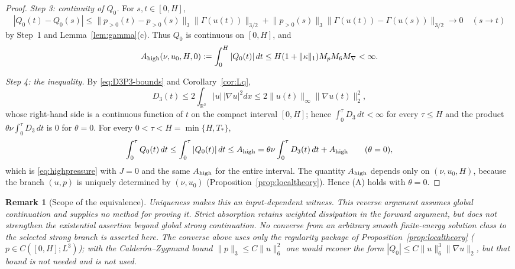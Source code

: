 \documentclass[11pt]{article}
\newtheorem{remark}[theorem]{Remark}
\theoremstyle{definition}
\theoremstyle{plain}
\newcommand{\R}{\mathbb R}
\newcommand{\norm}[1]{\lVert #1\rVert}
\begin{document}
\begin{proof}
\emph{Step 3: continuity of $Q_0$.}  For $s,t\in[0,H]$,
\[
 |Q_0(t)-Q_0(s)|
 \le\norm{p_{>0}(t)-p_{>0}(s)}_3\norm{\Gamma(u(t))}_{3/2}
 +\norm{p_{>0}(s)}_3\norm{\Gamma(u(t))-\Gamma(u(s))}_{3/2}\to0
 \quad(s\to t)
\]
by Step~1 and Lemma~\ref{lem:gamma}(c).  Thus $Q_0$ is continuous on
$[0,H]$, and
\[
 A_{\rm high}(\nu,u_0,H,0):=\int_0^H|Q_0(t)|\,dt
 \le H(1+\norm\kappa_1)M_pM_6M_\nabla<\infty .
\]

\emph{Step 4: the inequality.}
By \eqref{eq:D3P3-bounds} and Corollary~\ref{cor:Lq},
\[
 D_3(t)\le2\int_{\R^3}|u|\,|\nabla u|^2dx
 \le2\norm{u(t)}_\infty\norm{\nabla u(t)}_2^2,
\]
whose right-hand side is a continuous function of $t$ on the compact interval $[0,H]$;
hence $\int_0^\tau D_3\,dt<\infty$ for every $\tau\le H$ and the product
$\theta\nu\int_0^\tau D_3\,dt$ is $0$ for $\theta=0$.
For every $0<\tau<H=\min\{H,T_*\}$,
\[
 \int_0^\tau Q_0(t)\,dt\le\int_0^\tau|Q_0(t)|\,dt\le A_{\rm high}
 =\theta\nu\int_0^\tau D_3(t)\,dt+A_{\rm high}\qquad(\theta=0),
\]
which is \eqref{eq:highpressure} with $J=0$ and the same $A_{\rm high}$ for
the entire interval.  The quantity $A_{\rm high}$ depends only on
$(\nu,u_0,H)$, because the branch $(u,p)$ is uniquely determined by
$(\nu,u_0)$ (Proposition~\ref{prop:localtheory}).  Hence (A) holds with
$\theta=0$.
\end{proof}

\begin{remark}[Scope of the equivalence]\label{rem:existential-scope}
Uniqueness makes this an input-dependent witness.  This reverse argument
assumes global continuation and supplies no method for proving it.  Strict
absorption retains weighted dissipation in the forward argument, but does
not strengthen the existential assertion beyond global strong continuation.
No converse from an arbitrary smooth finite-energy solution class to the
selected strong branch is asserted here.  The converse above uses only the
regularity package of Proposition~\ref{prop:localtheory}
($p\in C([0,H];L^3)$); with the Calder\'on--Zygmund bound
$\norm p_3\le C\norm{u}_6^2$ one would recover the form
$|Q_0|\le C\norm u_6^3\norm{\nabla u}_2$, but that bound is not needed and
is not used.
\end{remark}
\end{document}
